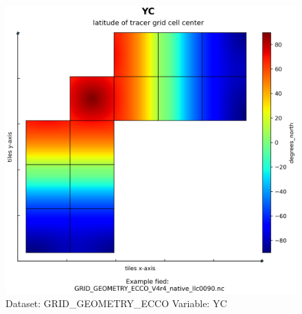 \begin{figure}[H]
\centering
\includegraphics[width=\textwidth]{../images/plots/native_plots_coords/Geometry_Parameters_for_the_Lat-Lon-Cap_90_(llc90)_Native_Model_Grid_(Version_4_Release_4)/YC.png}
\caption{Dataset: GRID\_GEOMETRY\_ECCO Variable: YC}
\label{tab:table-GRID_GEOMETRY_ECCO_YC-Plot}
\end{figure}
\pagebreak
